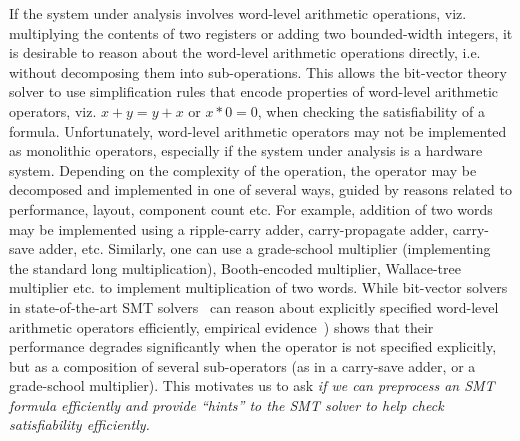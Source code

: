 If the system under analysis involves word-level arithmetic
operations, viz.  multiplying the contents of two registers or adding
two bounded-width integers, it is desirable to reason about the
word-level arithmetic operations directly, i.e. without decomposing
them into sub-operations.  This allows the bit-vector theory solver to
use simplification rules that encode properties of word-level
arithmetic operators, viz. $x + y = y + x$ or $x * 0 = 0$, when
checking the satisfiability of a formula.  Unfortunately, word-level
arithmetic operators may not be implemented as monolithic operators,
especially if the system under analysis is a hardware system.
Depending on the complexity of the operation, the operator may be
decomposed and implemented in one of several ways, guided by reasons
related to performance, layout, component count etc.  For example,
addition of two words may be implemented using a ripple-carry adder,
carry-propagate adder, carry-save adder, etc.  Similarly, one can use
a grade-school multiplier (implementing the standard long
multiplication), Booth-encoded multiplier, Wallace-tree multiplier
etc. to implement multiplication of two words.  While bit-vector
solvers in state-of-the-art SMT
solvers~\cite{zthree,cvcfour,boolector,mathsat} can reason about
explicitly specified word-level arithmetic operators efficiently,
empirical evidence~\cite{wste}) shows that their performance degrades
significantly when the operator is not specified explicitly, but as a
composition of several sub-operators (as in a carry-save adder, or a
grade-school multiplier).  This motivates us to ask \emph{if we can
  preprocess an SMT formula efficiently and provide ``hints'' to the
  SMT solver to help check satisfiability efficiently.}  

